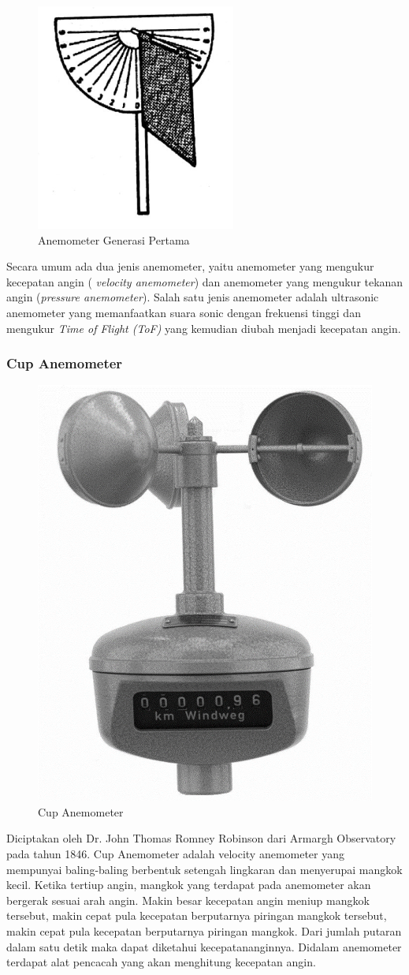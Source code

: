 \begin{figure}[h!]
	\centering
	\includegraphics[width=0.3\linewidth]{gambar/anemometerGen1}
	\caption{Anemometer Generasi Pertama \parencite{Panjaitan2018}}
	\label{fig:anemometergen1}
\end{figure}

Secara umum ada dua jenis anemometer, yaitu anemometer yang mengukur kecepatan angin (\textit{
velocity anemometer}) dan anemometer yang mengukur tekanan angin (\textit{pressure anemometer}).
Salah satu jenis anemometer adalah ultrasonic anemometer yang memanfaatkan suara sonic dengan frekuensi tinggi dan mengukur \textit{Time of Flight (ToF)} yang kemudian diubah menjadi kecepatan angin.

\subsubsection{Cup Anemometer}

\begin{figure}[h!]
	\centering
	\includegraphics[width=0.3\linewidth]{gambar/anemometerCup}
	\caption{Cup Anemometer \parencite{figCupAnemometer}}
	\label{fig:anemometercup}
\end{figure}

Diciptakan oleh Dr. John Thomas Romney Robinson dari Armargh Observatory pada tahun 1846.
Cup Anemometer adalah velocity anemometer yang mempunyai baling-baling berbentuk setengah lingkaran dan menyerupai mangkok kecil. Ketika tertiup angin, mangkok 
yang terdapat pada anemometer akan bergerak sesuai arah angin. Makin besar kecepatan angin meniup mangkok tersebut, makin cepat pula kecepatan 
berputarnya piringan mangkok tersebut, makin cepat pula kecepatan berputarnya piringan mangkok. Dari jumlah putaran dalam satu detik maka dapat 
diketahui kecepatananginnya. Didalam anemometer terdapat alat pencacah yang akan menghitung kecepatan angin.

